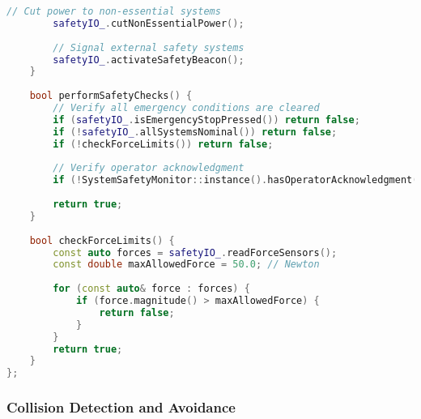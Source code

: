 \begin{lstlisting}[language=C++, caption=Emergency Stop Implementation]
        // Cut power to non-essential systems
        safetyIO_.cutNonEssentialPower();
        
        // Signal external safety systems
        safetyIO_.activateSafetyBeacon();
    }
    
    bool performSafetyChecks() {
        // Verify all emergency conditions are cleared
        if (safetyIO_.isEmergencyStopPressed()) return false;
        if (!safetyIO_.allSystemsNominal()) return false;
        if (!checkForceLimits()) return false;
        
        // Verify operator acknowledgment
        if (!SystemSafetyMonitor::instance().hasOperatorAcknowledgment()) return false;
        
        return true;
    }
    
    bool checkForceLimits() {
        const auto forces = safetyIO_.readForceSensors();
        const double maxAllowedForce = 50.0; // Newton
        
        for (const auto& force : forces) {
            if (force.magnitude() > maxAllowedForce) {
                return false;
            }
        }
        return true;
    }
};
\end{lstlisting}

\subsubsection{Collision Detection and Avoidance}

